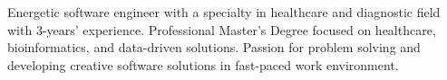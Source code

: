 

\begin{cvparagraph}


Energetic software engineer with a specialty in healthcare and diagnostic field with 3-years’ experience. Professional Master’s Degree focused on healthcare, bioinformatics, and data-driven solutions. Passion for problem solving and developing creative software solutions in fast-paced work environment.
\end{cvparagraph}
